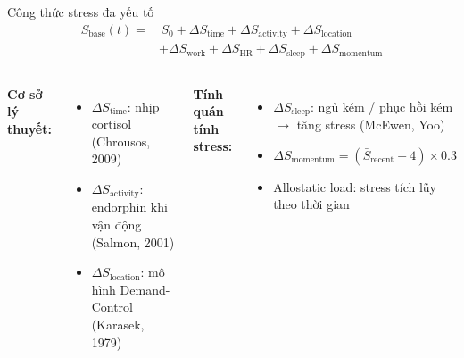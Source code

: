 \documentclass[11pt]{beamer}
\begin{document}
\begin{frame}{Công thức stress đa yếu tố}
\small
\begin{equation*}
\boxed{
\begin{aligned}
S_{\text{base}}(t)=&\,S_0+\Delta S_{\text{time}}+\Delta S_{\text{activity}}+\Delta S_{\text{location}}\\
&+\Delta S_{\text{work}}+\Delta S_{\text{HR}}+\Delta S_{\text{sleep}}+\Delta S_{\text{momentum}}
\end{aligned}}
\end{equation*}

\vspace{0.1cm}
\begin{columns}[T]
\textbf{Cơ sở lý thuyết:}
\begin{itemize}
    \scriptsize
    \item $\Delta S_{\text{time}}$: nhịp cortisol (Chrousos, 2009)
    \item $\Delta S_{\text{activity}}$: endorphin khi vận động (Salmon, 2001)
    \item $\Delta S_{\text{location}}$: mô hình Demand-Control (Karasek, 1979)
\end{itemize}

\textbf{Tính quán tính stress:}
\begin{itemize}
    \scriptsize
    \item $\Delta S_{\text{sleep}}$: ngủ kém / phục hồi kém $\rightarrow$ tăng stress (McEwen, Yoo)
    \item $\Delta S_{\text{momentum}} = (\bar{S}_{\text{recent}} - 4) \times 0.3$
    \item Allostatic load: stress tích lũy theo thời gian
\end{itemize}
\end{columns}

\vspace{0.15cm}
\end{frame}
\end{document}
